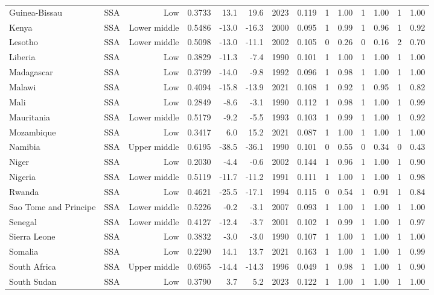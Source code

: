 \begin{longtable}{llrrrrrrrrrrrr}
Guinea-Bissau & SSA & Low & 0.3733 &  13.1 &  19.6 & 2023 & 0.119 & 1 & 1.00 & 1 & 1.00 & 1 & 1.00 \\
Kenya & SSA & Lower middle & 0.5486 & -13.0 & -16.3 & 2000 & 0.095 & 1 & 0.99 & 1 & 0.96 & 1 & 0.92 \\
Lesotho & SSA & Lower middle & 0.5098 & -13.0 & -11.1 & 2002 & 0.105 & 0 & 0.26 & 0 & 0.16 & 2 & 0.70 \\
Liberia & SSA & Low & 0.3829 & -11.3 &  -7.4 & 1990 & 0.101 & 1 & 1.00 & 1 & 1.00 & 1 & 1.00 \\
Madagascar & SSA & Low & 0.3799 & -14.0 &  -9.8 & 1992 & 0.096 & 1 & 0.98 & 1 & 1.00 & 1 & 1.00 \\
Malawi & SSA & Low & 0.4094 & -15.8 & -13.9 & 2021 & 0.108 & 1 & 0.92 & 1 & 0.95 & 1 & 0.82 \\
Mali & SSA & Low & 0.2849 &  -8.6 &  -3.1 & 1990 & 0.112 & 1 & 0.98 & 1 & 1.00 & 1 & 0.99 \\
Mauritania & SSA & Lower middle & 0.5179 &  -9.2 &  -5.5 & 1993 & 0.103 & 1 & 0.99 & 1 & 1.00 & 1 & 0.92 \\
Mozambique & SSA & Low & 0.3417 &   6.0 &  15.2 & 2021 & 0.087 & 1 & 1.00 & 1 & 1.00 & 1 & 1.00 \\
Namibia & SSA & Upper middle & 0.6195 & -38.5 & -36.1 & 1990 & 0.101 & 0 & 0.55 & 0 & 0.34 & 0 & 0.43 \\
Niger & SSA & Low & 0.2030 &  -4.4 &  -0.6 & 2002 & 0.144 & 1 & 0.96 & 1 & 1.00 & 1 & 0.90 \\
Nigeria & SSA & Lower middle & 0.5119 & -11.7 & -11.2 & 1991 & 0.111 & 1 & 1.00 & 1 & 1.00 & 1 & 0.98 \\
Rwanda & SSA & Low & 0.4621 & -25.5 & -17.1 & 1994 & 0.115 & 0 & 0.54 & 1 & 0.91 & 1 & 0.84 \\
Sao Tome and Principe & SSA & Lower middle & 0.5226 &  -0.2 &  -3.1 & 2007 & 0.093 & 1 & 1.00 & 1 & 1.00 & 1 & 1.00 \\
Senegal & SSA & Lower middle & 0.4127 & -12.4 &  -3.7 & 2001 & 0.102 & 1 & 0.99 & 1 & 1.00 & 1 & 0.97 \\
Sierra Leone & SSA & Low & 0.3832 &  -3.0 &  -3.0 & 1990 & 0.107 & 1 & 1.00 & 1 & 1.00 & 1 & 1.00 \\
Somalia & SSA & Low & 0.2290 &  14.1 &  13.7 & 2021 & 0.163 & 1 & 1.00 & 1 & 1.00 & 1 & 0.99 \\
South Africa & SSA & Upper middle & 0.6965 & -14.4 & -14.3 & 1996 & 0.049 & 1 & 0.98 & 1 & 1.00 & 1 & 0.90 \\
South Sudan & SSA & Low & 0.3790 &   3.7 &   5.2 & 2023 & 0.122 & 1 & 1.00 & 1 & 1.00 & 1 & 1.00 \\

\end{longtable}
